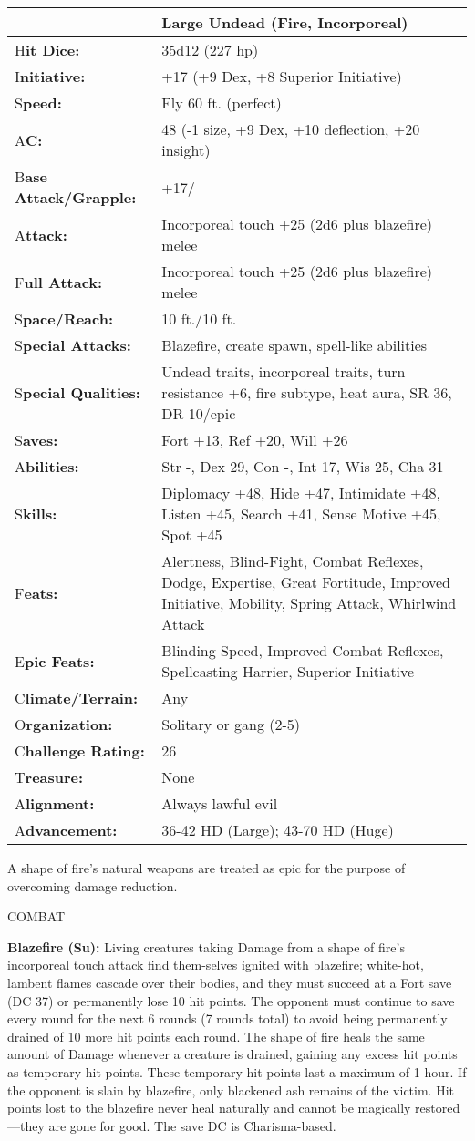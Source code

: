 \documentclass{article}
\begin{document}
{\begin{tabular}{|>{\raggedright}p{66pt}|>{\raggedright}p{259pt}|}
\hline
  & Large Undead (Fire, Incorporeal) \tabularnewline
\hline
H\textbf{it Dice:} & 35d12 (227 hp) \tabularnewline
\hline
I\textbf{nitiative:} & +17 (+9 Dex, +8 Superior Initiative) \tabularnewline
\hline
S\textbf{peed:} & Fly 60 ft. (perfect) \tabularnewline
\hline
A\textbf{C:} & 48 (-1 size, +9 Dex, +10 deflection, +20 insight) \tabularnewline
\hline
B\textbf{ase Attack/Grapple:} & +17/-\tabularnewline
\hline
A\textbf{ttack:} & Incorporeal touch +25 (2d6 plus blazefire) melee\tabularnewline
\hline
F\textbf{ull Attack:} & Incorporeal touch +25 (2d6 plus blazefire) melee\tabularnewline
\hline
S\textbf{pace/Reach:} & 10 ft./10 ft. \tabularnewline
\hline
S\textbf{pecial Attacks:} & Blazefire, create spawn, spell-like abilities \tabularnewline
\hline
S\textbf{pecial Qualities:} & Undead traits, incorporeal traits, turn resistance 
+6, fire subtype, heat aura, SR 36, DR 10/epic \tabularnewline
\hline
S\textbf{aves:} & Fort +13, Ref +20, Will +26 \tabularnewline
\hline
A\textbf{bilities:} & Str -, Dex 29, Con -, Int 17, Wis 25, Cha 31 \tabularnewline
\hline
S\textbf{kills:} & Diplomacy +48, Hide +47, Intimidate +48, Listen +45, Search 
+41, Sense Motive +45, Spot +45\tabularnewline
\hline
F\textbf{eats:} & Alertness, Blind-Fight, Combat Reflexes, Dodge, Expertise, Great 
Fortitude, Improved Initiative, Mobility, Spring Attack, Whirlwind Attack \tabularnewline
\hline
E\textbf{pic Feats:} & Blinding Speed, Improved Combat Reflexes, Spellcasting Harrier, 
Superior Initiative \tabularnewline
\hline
C\textbf{limate/Terrain:} & Any \tabularnewline
\hline
O\textbf{rganization:} & Solitary or gang (2-5) \tabularnewline
\hline
C\textbf{hallenge Rating:} & 26 \tabularnewline
\hline
T\textbf{reasure:} & None \tabularnewline
\hline
A\textbf{lignment:} & Always lawful evil \tabularnewline
\hline
A\textbf{dvancement:} & 36-42 HD (Large); 43-70 HD (Huge) \tabularnewline
\hline
\end{tabular}

A shape of fire's natural weapons are treated as epic for the purpose of overcoming 
damage reduction.

COMBAT 

\textbf{Blazefire (Su): }Living creatures taking Damage from a shape of fire's 
incorporeal touch attack find them-selves ignited with blazefire; white-hot, lambent 
flames cascade over their bodies, and they must succeed at a Fort save (DC 37) 
or permanently lose 10 hit points. The opponent must continue to save every round 
for the next 6 rounds (7 rounds total) to avoid being permanently drained of 10 
more hit points each round. The shape of fire heals the same amount of Damage whenever 
a creature is drained, gaining any excess hit points as temporary hit points. These 
temporary hit points last a maximum of 1 hour. If the opponent is slain by blazefire, 
only blackened ash remains of the victim. Hit points lost to the blazefire never 
heal naturally and cannot be magically restored---they are gone for good. The save 
DC is Charisma-based.

}
\end{document}
